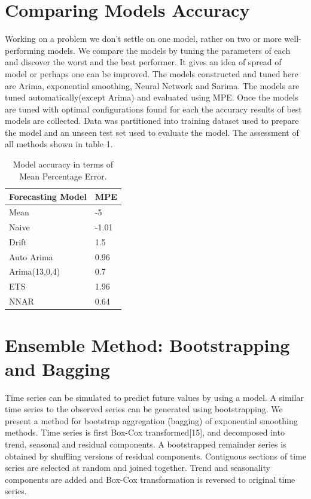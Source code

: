 \documentclass[runningheads]{llncs}
\begin{document}
\section{Comparing Models Accuracy}
Working on a problem we don't settle on one model, rather on two or more well-performing models. We compare the models by tuning the parameters of each and discover the worst and the best performer. It gives an idea of spread of model or perhaps one can be improved.
The models constructed and tuned here are Arima, exponential smoothing, Neural Network and Sarima. The models are tuned automatically(except Arima) and evaluated using MPE. Once the models are tuned with optimal configurations found for each the accuracy results of best models are collected. Data was partitioned into training dataset used to prepare the model and an unseen test set used to evaluate the model.
The assessment of all methods shown in table 1.
\begin{table}
\centering
\caption{Model accuracy in terms of Mean Percentage Error.}\label{tab1}
\begin{tabular}{|l|l|}
\hline
Forecasting Model &  MPE\\
\hline
Mean &  -5\\
Naive &  -1.01\\
Drift & 1.5\\
Auto Arima & 0.96 \\
Arima(13,0,4) & 0.7\\
ETS & 1.96 \\
NNAR & 0.64 \\
\hline
\end{tabular}
\end{table}

\section{Ensemble Method: Bootstrapping and Bagging}
Time series can be simulated to predict future values by using a model. A similar time series to the observed series can be generated using bootstrapping. We present a method for bootstrap aggregation (bagging) of exponential smoothing methods. Time series is first Box-Cox transformed[15], and decomposed into trend, seasonal and residual components. A bootstrapped remainder series is obtained by shuffling versions of residual components. Contiguous sections of time series are selected at random and joined together. Trend and seasonality components are added and Box-Cox transformation is reversed to original time series.
\end{document}
